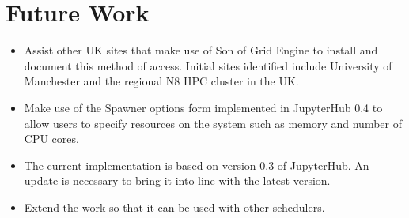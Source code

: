 \documentclass{deliverablereport}
\begin{document}
\section{Future Work}
\begin{itemize}
\item Assist other UK sites that make use of Son of Grid Engine to install and document this method of access. Initial sites identified include University of Manchester and the regional N8 HPC cluster in the UK.
\item Make use of the Spawner options form implemented in JupyterHub 0.4 to allow users to specify resources on the system such as memory and number of CPU cores.
\item The current implementation is based on version 0.3 of JupyterHub. An update is necessary to bring it into line with the latest version.
\item Extend the work so that it can be used with other schedulers.
\end{itemize}
\end{document}
